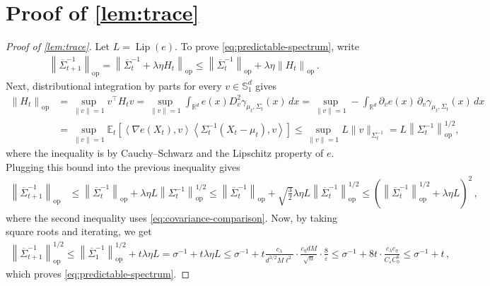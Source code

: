 \documentclass[11pt]{article}
\newcommand{\R}{\mathbb R}
\newcommand{\E}{\mathbb E}
\newcommand{\Lip}{\operatorname{Lip}}
\newcommand{\op}{\mathrm{op}}
\newcommand{\1}{\mathbf 1}
\newcommand{\eps}{\varepsilon}
\newcommand{\ip}[2]{\left\langle #1,#2\right\rangle}
\newcommand{\norm}[1]{\left\lVert #1\right\rVert}
\begin{document}
\section{Proof of \cref{lem:trace}}
\label{app:trace}

\begin{proof}[Proof of \cref{lem:trace}]
    Let $L=\Lip(e)$.
    To prove \eqref{eq:predictable-spectrum}, write
    \begin{align}
        \norm{\overline\Sigma_{t+1}^{-1}}_{\op}
        =
        \norm{\overline\Sigma_{t}^{-1} + \lambda\eta H_t}_{\op}
        \leq
        \norm{\overline\Sigma_{t}^{-1}}_{\op} + \lambda\eta\norm{H_t}_{\op}\,.
    \end{align}
    Next, distributional integration by parts for every $v\in\mathbb{S}_1^d$ gives
    \begin{align}
        \norm{H_t}_{\op}
         & =
        \sup_{\|v\|=1} v^\top H_t v
        =
        \sup_{\|v\|=1}
        \int_{\R^d}e(x) D^2_v\gamma_{\mu_t,\Sigma_t}(x)\,dx
        =
        \sup_{\|v\|=1}
        -\int_{\R^d}\partial_ve(x)\,
        \partial_v\gamma_{\mu_t,\Sigma_t}(x)\,dx
        \\
         & =
        \sup_{\|v\|=1}
        \E_t\left[
            \ip{\nabla e(X_t)}{v}
            \ip{\Sigma_t^{-1}(X_t-\mu_t)}{v}
            \right]
        \leq
        \sup_{\|v\|=1}
        L \|v\|_{\Sigma_t^{-1}}
        =
        L \norm{\Sigma_t^{-1}}_{\op}^{1/2},
        \label{eq:H-quadratic-bound}
    \end{align}
    where the inequality is by Cauchy--Schwarz and the Lipschitz property of $e$.
    Plugging this bound into the previous inequality gives
    \begin{align}
        \norm{\overline\Sigma_{t+1}^{-1}}_{\op}
         & \leq
        \norm{\overline\Sigma_{t}^{-1}}_{\op} + \lambda\eta L \norm{\Sigma_t^{-1}}_{\op}^{1/2}
        \leq
        \norm{\overline\Sigma_{t}^{-1}}_{\op} + \sqrt{\frac{3}{2}}\lambda\eta L\norm{\overline\Sigma_{t}^{-1}}_{\op}^{1/2}
        \leq
        \left(\norm{\overline\Sigma_{t}^{-1}}_{\op}^{1/2} + \lambda\eta L\right)^2\,,
        \label{eq:predictable-spectrum-bound}
    \end{align}
    where the second inequality uses \eqref{eq:covariance-comparison}.
    Now, by taking square roots and iterating, we get
    \begin{align}
        \norm{\overline\Sigma_{t+1}^{-1}}_{\op}^{1/2}
        \leq
        \norm{\overline\Sigma_1^{-1}}_{\op}^{1/2} + t\lambda\eta L
        = \sigma^{-1}+t\lambda\eta L
        \leq \sigma^{-1} + t \frac{c_\lambda}{d^{3/2}M\ell^2} \cdot \frac{c_\eta dM}{\sqrt n} \cdot \frac{8}{\eps}
        \leq
        \sigma^{-1} + 8t\cdot \frac{c_\lambda c_\eta}{C_\eps C_0^6}
        \leq
        \sigma^{-1} + t\,,
    \end{align}
    which proves \eqref{eq:predictable-spectrum}.



\end{proof}
\end{document}
